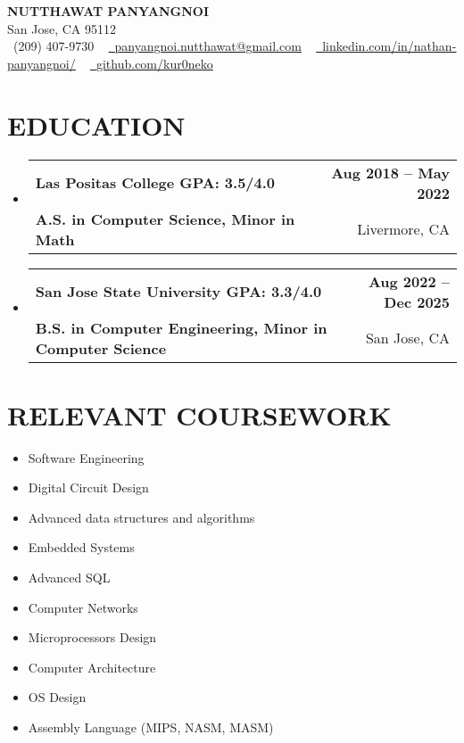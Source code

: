\documentclass[letterpaper,11pt]{article}
\makeatletter
\newcommand{\resumeSubheading}[4]{
  \vspace{-2pt}\item
    \begin{tabular*}{1.0\textwidth}[t]{l@{\extracolsep{\fill}}r}
      \textbf{#1} & \textbf{\small #2} \\
      {\small#3} & {\small #4} \\
    \end{tabular*}\vspace{-7pt}
}
\newcommand{\resumeSubHeadingListStart}{\begin{itemize}[leftmargin=0.0in, label={}]}
\newcommand{\resumeSubHeadingListEnd}{\end{itemize}}
\makeatother
\begin{document}
\vspace{-15pt}
\begin{center}
    {\large \scshape\textbf{NUTTHAWAT PANYANGNOI}} \\
    \vspace{0.4pt} San Jose, CA 95112 \\ \vspace{1pt} 
    \small \raisebox{-0.1\height}\faPhone\ (209) 407-9730 ~ \href{mailto:panyangnoi.nutthawat@gmail.com}{\raisebox{-0.2\height}\faEnvelope\  \underline{panyangnoi.nutthawat@gmail.com}} ~ 
    \href{https://www.linkedin.com/in/nathan-panyangnoi/}{\raisebox{-0.2\height}\faLinkedin\ \underline{linkedin.com/in/nathan-panyangnoi/}}  ~
    \href{https://github.com/kur0neko}{\raisebox{-0.2\height}\faGithub\ \underline{github.com/kur0neko}}
    \vspace{-8pt}
\end{center}

\section{EDUCATION}
  \resumeSubHeadingListStart
    \resumeSubheading
      {Las Positas College        GPA: 3.5/4.0}{Aug 2018 -- May 2022}
      {\textbf{A.S. in Computer Science, Minor in Math}}{Livermore, CA}
    \resumeSubheading
      {San Jose State University  GPA: 3.3/4.0}{Aug 2022 -- Dec 2025}
      {\textbf{B.S. in Computer Engineering, Minor in Computer Science}}{San Jose, CA}  
  \resumeSubHeadingListEnd

\section{RELEVANT COURSEWORK}
    \begin{multicols}{4}
        \begin{itemize}[itemsep=-1pt, parsep=3pt]
            \item \small Software Engineering
            \item \small Digital Circuit Design 
            \item \small Advanced data structures and algorithms
            \item \small Embedded Systems
            \item \small Advanced SQL 
            \item \small Computer Networks
            \item \small Microprocessors Design
            \item \small Computer Architecture
            \item \small OS Design
            \item \small Assembly Language (MIPS, NASM, MASM)
        \end{itemize}
    \end{multicols}
    \vspace*{1.5\multicolsep}
\vspace{-1pt}
\end{document}
